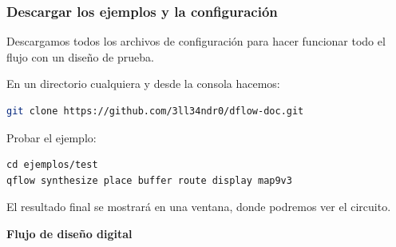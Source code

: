 \documentclass{beamer}
\begin{document}
\begin{frame}[fragile]
  \frametitle{Descargar los ejemplos y la configuración}
Descargamos todos los archivos de configuración para hacer funcionar todo el flujo con un diseño de prueba.

En un directorio cualquiera y desde la consola hacemos:
\begin{footnotesize}
  \begin{lstlisting}[language=bash]
git clone https://github.com/3ll34ndr0/dflow-doc.git
\end{lstlisting}
\end{footnotesize}

Probar el ejemplo:
\begin{footnotesize}
\begin{lstlisting}
cd ejemplos/test
qflow synthesize place buffer route display map9v3
\end{lstlisting}
\end{footnotesize}


El resultado final se mostrará en una ventana, donde podremos ver el circuito.

\end{frame}


\begin{frame}
\textbf{Flujo de diseño digital} 
   \begin{figure}[ht]
      \centering
    \end{figure}
\end{frame}
\end{document}
